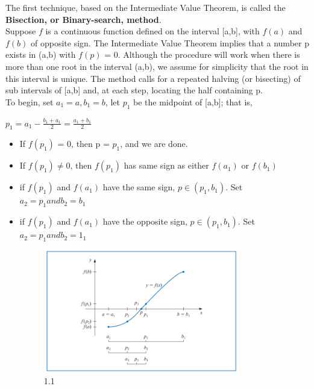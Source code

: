 \documentclass[12pt,a4paper]{article}
\begin{document}
	The first technique, based on the Intermediate Value Theorem, is called the \textbf{Bisection, or Binary-search, method}. \\
	
	Suppose \(f \) is a continuous function defined on the interval [a,b], with \(f(a)\) and \(f(b)\) of opposite sign. The Intermediate Value Theorem implies that a number p exists in (a,b) with \(f(p)\) = 0. Although the procedure will work when there is more than one root in the interval (a,b), we assume for simplicity that the root in this interval is unique. The method calls for a repeated halving (or bisecting)  of sub intervals of [a,b] and, at each step, locating the half containing p. \\
	 
	 To begin, set $a_{1} = a,b_{1} = b$, let $p_{1}$ be the midpoint of [a,b]; that is,
	 
	{ \centering
	$ p_{1} = a_{1} - \frac{b_{1} + a_{1}}{2} = \frac{a_{1} + b_{1}}{2}$ \\
}
	\begin{itemize}
		\item If \(f(p_{1})\) = 0, then p = $p_{1}$, and we are done. 
		\item If \(f(p_{1})\)$ \neq 0$, then \(f(p_{1})\) has same sign as either \(f(a_{1})\) or \(f(b_{1})\)
		
			\item if \(f(p_{1})\) and \(f(a_{1})\) have the same sign, $ p  \in (p_{1},b_{1})$. Set $a_{2}=p_{1} and b_{2}= b_{1}$
			
			\item if \(f(p_{1})\) and \(f(a_{1})\) have the opposite sign, $ p  \in (p_{1},b_{1})$. Set $a_{2}=p_{1} and b_{2}= 1_{1}$\\
			
			
							\begin{figure}[h]
							\centering
							\includegraphics[width=0.8\textwidth]{B1.png}
							\caption{1.1}
							
						\end{figure}
	\end{itemize}
	
\end{document}
